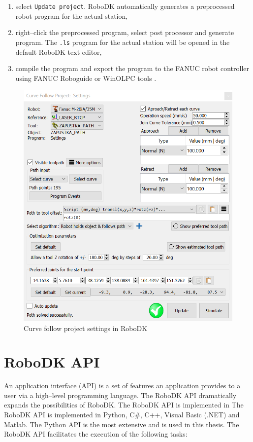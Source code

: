 \begin{enumerate}
\item select \texttt{Update project}. RoboDK automatically generates a preprocessed robot program for the actual station,

\item right--click the preprocessed program, select post processor and generate program. The \texttt{.ls} program for the actual station will be opened in the default RoboDK text editor,

\item compile the program and export the program to the FANUC robot controller using FANUC Roboguide or WinOLPC tools \cite{curvefollow}.
    
\end{enumerate}

\begin{figure}[h]
    \centering
    \includegraphics[width=0.9\linewidth]{img/curve_follow_settings.PNG}
    \caption{Curve follow project settings in RoboDK}
    \label{fig:curvefollow}
\end{figure}

\section{RoboDK API}

An application interface (API) is a set of features an application provides to a user via a high--level programming language. The RoboDK API dramatically expands the possibilities of RoboDK. The RoboDK API is implemented in The RoboDK API is implemented in Python, C\#, C++, Visual Basic (.NET) and Matlab.  The Python API is the most extensive and is used in this thesis. The RoboDK API facilitates the execution of the following tasks:

